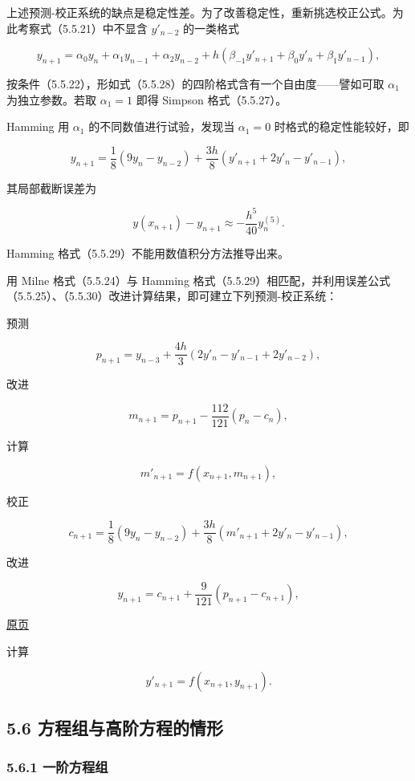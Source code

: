 \documentclass[
  10pt,
  fontset=fandol]{ctexart}
\begin{document}
上述预测-校正系统的缺点是稳定性差。为了改善稳定性，重新挑选校正公式。为此考察式（5.5.21）中不显含 \(y'_{n-2}\) 的一类格式

\[
y_{n+1}=\alpha_0y_n+\alpha_1y_{n-1}+\alpha_2y_{n-2}+h(\beta_{-1}y'_{n+1}+\beta_0y'_n+\beta_1y'_{n-1}),
\tag{5.5.28}
\]

按条件（5.5.22），形如式（5.5.28）的四阶格式含有一个自由度------譬如可取 \(\alpha_1\) 为独立参数。若取 \(\alpha_1=1\) 即得 Simpson 格式（5.5.27）。

Hamming 用 \(\alpha_1\) 的不同数值进行试验，发现当 \(\alpha_1=0\) 时格式的稳定性能较好，即

\[
y_{n+1}=\frac18(9y_n-y_{n-2})+\frac{3h}{8}(y'_{n+1}+2y'_n-y'_{n-1}),
\tag{5.5.29}
\]

其局部截断误差为

\[
y(x_{n+1})-y_{n+1}\approx-\frac{h^5}{40}y_n^{(5)}.
\tag{5.5.30}
\]

Hamming 格式（5.5.29）不能用数值积分方法推导出来。

用 Milne 格式（5.5.24）与 Hamming 格式（5.5.29）相匹配，并利用误差公式（5.5.25）、（5.5.30）改进计算结果，即可建立下列预测-校正系统：

预测

\[
p_{n+1}=y_{n-3}+\frac{4h}{3}(2y'_n-y'_{n-1}+2y'_{n-2}),
\]

改进

\[
m_{n+1}=p_{n+1}-\frac{112}{121}(p_n-c_n),
\]

计算

\[
m'_{n+1}=f(x_{n+1},m_{n+1}),
\]

校正

\[
c_{n+1}=\frac18(9y_n-y_{n-2})+\frac{3h}{8}(m'_{n+1}+2y'_n-y'_{n-1}),
\]

改进

\[
y_{n+1}=c_{n+1}+\frac9{121}(p_{n+1}-c_{n+1}),
\]

\href{../../source-images/pdf-145.jpeg}{原页}

计算

\[
y'_{n+1}=f(x_{n+1},y_{n+1}).
\]

\subsection{5.6 方程组与高阶方程的情形}\label{ux65b9ux7a0bux7ec4ux4e0eux9ad8ux9636ux65b9ux7a0bux7684ux60c5ux5f62}

\subsubsection{5.6.1 一阶方程组}\label{ux4e00ux9636ux65b9ux7a0bux7ec4}
\end{document}
